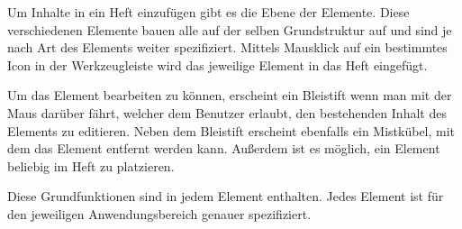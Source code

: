 \cfoot{}
Um Inhalte in ein Heft einzufügen gibt es die Ebene der Elemente. Diese verschiedenen Elemente bauen alle auf der selben Grundstruktur auf und sind je nach Art des Elements weiter spezifiziert.
Mittels Mausklick auf ein bestimmtes Icon in der Werkzeugleiste wird das jeweilige Element in das Heft eingefügt.

Um das Element bearbeiten zu können, erscheint ein Bleistift wenn man mit der Maus darüber fährt, welcher dem Benutzer erlaubt, den bestehenden Inhalt des Elements zu editieren. Neben dem Bleistift erscheint ebenfalls ein Mistkübel, mit dem das Element entfernt werden kann.
Außerdem ist es möglich, ein Element beliebig im Heft zu platzieren. 

Diese Grundfunktionen sind in jedem Element enthalten. Jedes Element ist für den jeweiligen Anwendungsbereich genauer spezifiziert.